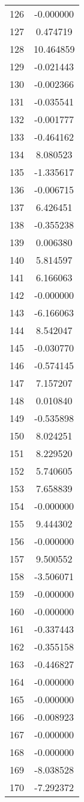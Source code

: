 \documentclass[12pt]{article}
\begin{document}
\begin{longtable}{@{}cc@{}}
126 & -0.000000 \\
127 & 0.474719 \\
128 & 10.464859 \\
129 & -0.021443 \\
130 & -0.002366 \\
131 & -0.035541 \\
132 & -0.001777 \\
133 & -0.464162 \\
134 & 8.080523 \\
135 & -1.335617 \\
136 & -0.006715 \\
137 & 6.426451 \\
138 & -0.355238 \\
139 & 0.006380 \\
140 & 5.814597 \\
141 & 6.166063 \\
142 & -0.000000 \\
143 & -6.166063 \\
144 & 8.542047 \\
145 & -0.030770 \\
146 & -0.574145 \\
147 & 7.157207 \\
148 & 0.010840 \\
149 & -0.535898 \\
150 & 8.024251 \\
151 & 8.229520 \\
152 & 5.740605 \\
153 & 7.658839 \\
154 & -0.000000 \\
155 & 9.444302 \\
156 & -0.000000 \\
157 & 9.500552 \\
158 & -3.506071 \\
159 & -0.000000 \\
160 & -0.000000 \\
161 & -0.337443 \\
162 & -0.355158 \\
163 & -0.446827 \\
164 & -0.000000 \\
165 & -0.000000 \\
166 & -0.008923 \\
167 & -0.000000 \\
168 & -0.000000 \\
169 & -8.038528 \\
170 & -7.292372 \\

\end{longtable}
\end{document}
